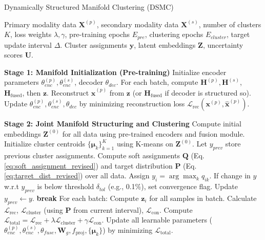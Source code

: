 \documentclass[journal]{IEEEtran}
\begin{document}
\begin{algorithm}[h!]
\caption{Dynamically Structured Manifold Clustering (DSMC)}
\label{alg:dsmc_training} %
\begin{algorithmic}[1]
\REQUIRE Primary modality data $\mathbf{X}^{(p)}$, secondary modality data $\mathbf{X}^{(s)}$, number of clusters $K$, loss weights $\lambda, \gamma$, pre-training epochs $E_{pre}$, clustering epochs $E_{cluster}$, target update interval $\Delta$.
\ENSURE Cluster assignments $\mathbf{y}$, latent embeddings $\mathbf{Z}$, uncertainty scores $\mathbf{U}$.

\STATE \textbf{Stage 1: Manifold Initialization (Pre-training)}
\STATE Initialize encoder parameters $\theta_{enc}^{(p)}, \theta_{enc}^{(s)}$, decoder $\theta_{dec}$.
    \STATE For each batch, compute $\mathbf{H}^{(p)}, \mathbf{H}^{(s)}$, $\mathbf{H}_{\text{fused}}$, then $\mathbf{z}$.
    \STATE Reconstruct $\hat{\mathbf{x}}^{(p)}$ from $\mathbf{z}$ (or $\mathbf{H}_{\text{fused}}$ if decoder is structured so).
    \STATE Update $\theta_{enc}^{(p)}, \theta_{enc}^{(s)}, \theta_{dec}$ by minimizing reconstruction loss $\mathcal{L}_{\text{rec}}(\mathbf{x}^{(p)}, \hat{\mathbf{x}}^{(p)})$.
\ENDFOR

\STATE \textbf{Stage 2: Joint Manifold Structuring and Clustering}
\STATE Compute initial embeddings $\mathbf{Z}^{(0)}$ for all data using pre-trained encoders and fusion module.
\STATE Initialize cluster centroids $\{\boldsymbol{\mu}_k\}_{k=1}^K$ using K-means on $\mathbf{Z}^{(0)}$.
\STATE Let $y_{prev}$ store previous cluster assignments.
        \STATE Compute soft assignments $\mathbf{Q}$ (Eq. \ref{eq:soft_assignment_revised}) and target distribution $\mathbf{P}$ (Eq. \ref{eq:target_dist_revised}) over all data.
        \STATE Assign $y_i = \arg\max_k q_{ik}$. If change in $y$ w.r.t $y_{prev}$ is below threshold $\delta_{tol}$ (e.g., 0.1\%), set convergence flag. Update $y_{prev} \leftarrow y$.
    \ENDIF
        \STATE \textbf{break}
    \ENDIF
    \STATE For each batch:
        \STATE Compute $\mathbf{z}_i$ for all samples in batch.
        \STATE Calculate $\mathcal{L}_{\text{rec}}$, $\mathcal{L}_{\text{cluster}}$ (using $\mathbf{P}$ from current interval), $\mathcal{L}_{\text{con}}$.
        \STATE Compute $\mathcal{L}_{\text{total}} = \mathcal{L}_{\text{rec}} + \lambda\mathcal{L}_{\text{cluster}} + \gamma\mathcal{L}_{\text{con}}$.
        \STATE Update all learnable parameters ($\theta_{enc}^{(p)}, \theta_{enc}^{(s)}, \theta_{fuse}, \mathbf{W}_g, f_{\text{proj}}, \{\boldsymbol{\mu}_k\}$) by minimizing $\mathcal{L}_{\text{total}}$.
\ENDFOR


\end{algorithmic}
\end{algorithm}
\end{document}

